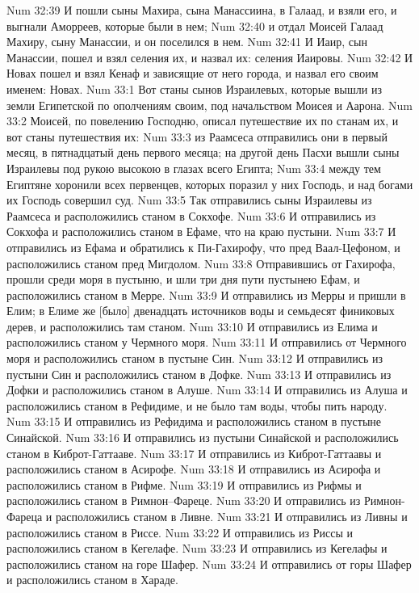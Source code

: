 Num 32:39  И пошли сыны Махира, сына Манассиина, в Галаад, и взяли его, и выгнали Аморреев, которые были в нем;
Num 32:40  и отдал Моисей Галаад Махиру, сыну Манассии, и он поселился в нем.
Num 32:41  И Иаир, сын Манассии, пошел и взял селения их, и назвал их: селения Иаировы.
Num 32:42  И Новах пошел и взял Кенаф и зависящие от него города, и назвал его своим именем: Новах.
Num 33:1  Вот станы сынов Израилевых, которые вышли из земли Египетской по ополчениям своим, под начальством Моисея и Аарона.
Num 33:2  Моисей, по повелению Господню, описал путешествие их по станам их, и вот станы путешествия их:
Num 33:3  из Раамсеса отправились они в первый месяц, в пятнадцатый день первого месяца; на другой день Пасхи вышли сыны Израилевы под рукою высокою в глазах всего Египта;
Num 33:4  между тем Египтяне хоронили всех первенцев, которых поразил у них Господь, и над богами их Господь совершил суд.
Num 33:5  Так отправились сыны Израилевы из Раамсеса и расположились станом в Сокхофе.
Num 33:6  И отправились из Сокхофа и расположились станом в Ефаме, что на краю пустыни.
Num 33:7  И отправились из Ефама и обратились к Пи-Гахирофу, что пред Ваал-Цефоном, и расположились станом пред Мигдолом.
Num 33:8  Отправившись от Гахирофа, прошли среди моря в пустыню, и шли три дня пути пустынею Ефам, и расположились станом в Мерре.
Num 33:9  И отправились из Мерры и пришли в Елим; в Елиме же [было] двенадцать источников воды и семьдесят финиковых дерев, и расположились там станом.
Num 33:10  И отправились из Елима и расположились станом у Чермного моря.
Num 33:11  И отправились от Чермного моря и расположились станом в пустыне Син.
Num 33:12  И отправились из пустыни Син и расположились станом в Дофке.
Num 33:13  И отправились из Дофки и расположились станом в Алуше.
Num 33:14  И отправились из Алуша и расположились станом в Рефидиме, и не было там воды, чтобы пить народу.
Num 33:15  И отправились из Рефидима и расположились станом в пустыне Синайской.
Num 33:16  И отправились из пустыни Синайской и расположились станом в Киброт-Гаттааве.
Num 33:17  И отправились из Киброт-Гаттаавы и расположились станом в Асирофе.
Num 33:18  И отправились из Асирофа и расположились станом в Рифме.
Num 33:19  И отправились из Рифмы и расположились станом в Римнон--Фареце.
Num 33:20  И отправились из Римнон-Фареца и расположились станом в Ливне.
Num 33:21  И отправились из Ливны и расположились станом в Риссе.
Num 33:22  И отправились из Риссы и расположились станом в Кегелафе.
Num 33:23  И отправились из Кегелафы и расположились станом на горе Шафер.
Num 33:24  И отправились от горы Шафер и расположились станом в Хараде.
